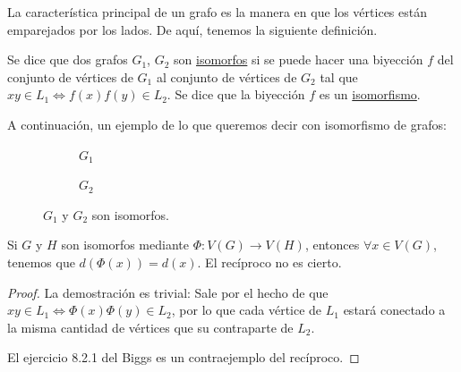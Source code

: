 La característica principal de un grafo es la manera en que los vértices están emparejados por los lados. De aquí, tenemos la siguiente definición.

\begin{defn}
    Se dice que dos grafos $G_1$, $G_2$ son \ul{isomorfos} si se puede hacer una biyección $f$ del conjunto de vértices de $G_1$ al conjunto de vértices de $G_2$ tal que $xy \in L_1 \iff f(x)f(y) \in L_2$. Se dice que la biyección $f$ es un \ul{isomorfismo}.
\end{defn}

\begin{ejem}
    A continuación, un ejemplo de lo que queremos decir con isomorfismo de grafos:
    
    \begin{figure}
        \begin{subfigure}[b]{.5\textwidth}
            \centering
            \caption{$G_1$}
        \end{subfigure}
        \hfill
        \begin{subfigure}[b]{.5\textwidth}
            \centering
            \caption{$G_2$}
        \end{subfigure}
        \caption{$G_1$ y $G_2$ son isomorfos.} 
    \end{figure}
\end{ejem}

\begin{teo}
    Si $G$ y $H$ son isomorfos mediante $\Phi: V(G) \rightarrow V(H)$, entonces $\forall x \in V(G)$, tenemos que $d(\Phi(x)) = d(x)$. El recíproco no es cierto.
\end{teo}

\begin{proof}
    La demostración es trivial: Sale por el hecho de que $xy \in L_1 \iff \Phi(x)\Phi(y) \in L_2$, por lo que cada vértice de $L_1$ estará conectado a la misma cantidad de vértices que su contraparte de $L_2$.
    
    El ejercicio 8.2.1 del Biggs es un contraejemplo del recíproco.
\end{proof}

